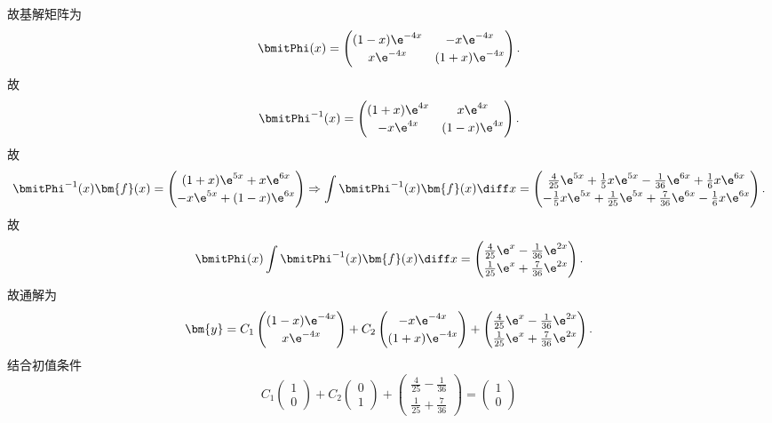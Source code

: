 \begin{solve}
  故基解矩阵为
  \[\bmitPhi(x)=\begin{pmatrix}(1-x)\e^{-4x}&-x\e^{-4x}\\x\e^{-4x}&(1+x)\e^{-4x}\end{pmatrix}.\]
  故
  \[\bmitPhi^{-1}(x)=\begin{pmatrix}(1+x)\e^{4x}&x\e^{4x}\\-x\e^{4x}&(1-x)\e^{4x}\end{pmatrix}.\]
  故
  \[\bmitPhi^{-1}(x)\bm{f}(x)=\begin{pmatrix}(1+x)\e^{5x}+x\e^{6x}\\-x\e^{5x}+(1-x)\e^{6x}\end{pmatrix}\Rightarrow\int\bmitPhi^{-1}(x)\bm{f}(x)\diff x=
  \renewcommand\arraystretch{1.2}\begin{pmatrix}\frac{4}{25}\e^{5x}+\frac{1}{5}x\e^{5x}-\frac{1}{36}\e^{6x}+\frac{1}{6}x\e^{6x}\\-\frac{1}{5}x\e^{5x}+\frac{1}{25}\e^{5x}+\frac{7}{36}\e^{6x}-\frac{1}{6}x\e^{6x}\end{pmatrix}.\]
  故
  \[\bmitPhi(x)\int\bmitPhi^{-1}(x)\bm{f}(x)\diff x=
  \renewcommand\arraystretch{1.2}\begin{pmatrix}\frac{4}{25}\e^x-\frac{1}{36}\e^{2x}\\\frac{1}{25}\e^x+\frac{7}{36}\e^{2x}\end{pmatrix}.\]
  故通解为
  \[\bm{y}=C_1\begin{pmatrix}(1-x)\e^{-4x}\\x\e^{-4x}\end{pmatrix}+C_2\begin{pmatrix}-x\e^{-4x}\\(1+x)\e^{-4x}\end{pmatrix}+\renewcommand\arraystretch{1.2}\begin{pmatrix}\frac{4}{25}\e^x-\frac{1}{36}\e^{2x}\\\frac{1}{25}\e^x+\frac{7}{36}\e^{2x}\end{pmatrix}.\]
  结合初值条件
  \[C_1\begin{pmatrix}1\\0\end{pmatrix}+C_2\begin{pmatrix}0\\1\end{pmatrix}+\begin{pmatrix}\frac{4}{25}-\frac{1}{36}\\\frac{1}{25}+\frac{7}{36}\end{pmatrix}=\begin{pmatrix}1\\0\end{pmatrix}\]

\end{solve}
